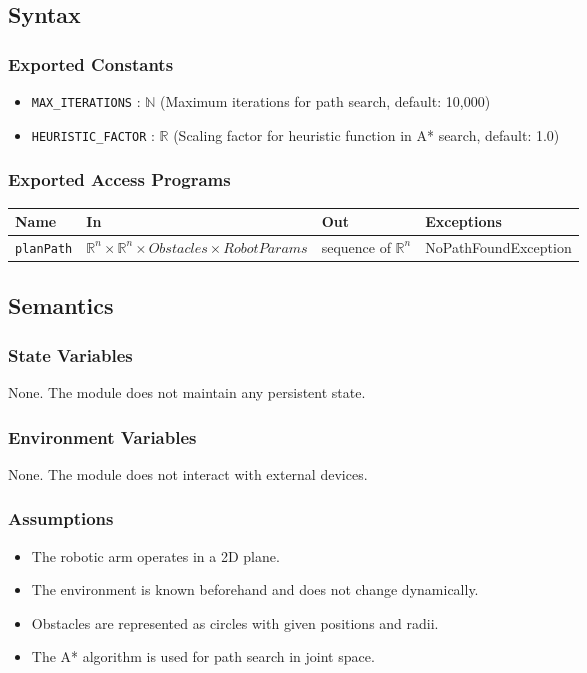 \documentclass[12pt, titlepage]{article}
\begin{document}
\subsection{Syntax}

\subsubsection{Exported Constants}
\begin{itemize}
  \item \texttt{MAX\_ITERATIONS} : $\mathbb{N}$ \quad (Maximum iterations for path search, default: 10,000)
  \item \texttt{HEURISTIC\_FACTOR} : $\mathbb{R}$ \quad (Scaling factor for heuristic function in A* search, default: 1.0)
\end{itemize}

\subsubsection{Exported Access Programs}
\begin{center}
  \renewcommand{\arraystretch}{1.4}
  \begin{tabular}{p{3.5cm} p{3cm} p{4cm} p{4cm}}
  \toprule
  \textbf{Name} & \textbf{In} & \textbf{Out} & \textbf{Exceptions} \\
  \midrule
  \texttt{planPath} & $\mathbb{R}^n \times \mathbb{R}^n \times Obstacles \times RobotParams$ & sequence of $\mathbb{R}^n$ & NoPathFoundException \\[4pt]
  \bottomrule
  \end{tabular}
\end{center}

\subsection{Semantics}

\subsubsection{State Variables}
None. The module does not maintain any persistent state.

\subsubsection{Environment Variables}
None. The module does not interact with external devices.

\subsubsection{Assumptions}
\begin{itemize}
  \item The robotic arm operates in a 2D plane.
  \item The environment is known beforehand and does not change dynamically.
  \item Obstacles are represented as circles with given positions and radii.
  \item The A* algorithm is used for path search in joint space.
\end{itemize}
\end{document}
